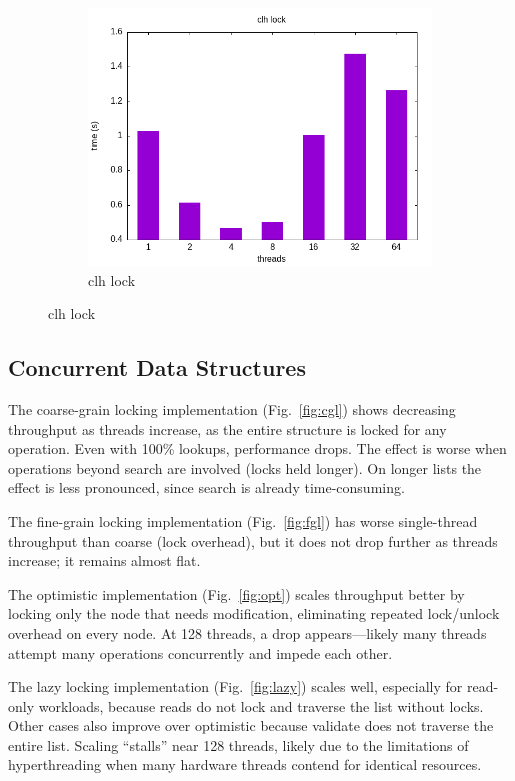 \documentclass{article}
\newcommand{\eng}[1]{#1}
\begin{document}
\begin{figure}
\begin{subfigure}{0.6\textwidth}
        \includegraphics[width=\textwidth]{a3/plots/clh_lock.png}
        \caption{\eng{clh lock}}
        \label{fig:clh}
    \end{subfigure}
\end{figure}
\FloatBarrier

\subsection{Concurrent Data Structures}

The \eng{coarse-grain locking} implementation (Fig.~\ref{fig:cgl}) shows decreasing throughput as threads increase, as the entire structure is locked for any operation. Even with 100\% lookups, performance drops. The effect is worse when operations beyond search are involved (locks held longer). On longer lists the effect is less pronounced, since search is already time-consuming.

The \eng{fine-grain locking} implementation (Fig.~\ref{fig:fgl}) has worse single-thread throughput than coarse (lock overhead), but it does not drop further as threads increase; it remains almost flat.

The \eng{optimistic} implementation (Fig.~\ref{fig:opt}) scales throughput better by locking only the node that needs modification, eliminating repeated lock/unlock overhead on every node. At 128 threads, a drop appears—likely many threads attempt many operations concurrently and impede each other.

The \eng{lazy locking} implementation (Fig.~\ref{fig:lazy}) scales well, especially for read-only workloads, because reads do not lock and traverse the list without locks. Other cases also improve over optimistic because \eng{validate} does not traverse the entire list. Scaling “stalls” near 128 threads, likely due to the limitations of hyperthreading when many hardware threads contend for identical resources.
\end{document}
